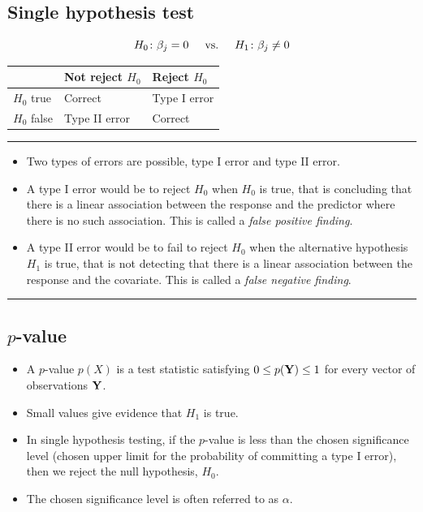 \documentclass[
  letterpaper,
  DIV=11,
  numbers=noendperiod]{scrartcl}
\providecommand{\tightlist}{%
  \setlength{\itemsep}{0pt}\setlength{\parskip}{0pt}}\usepackage{longtable,booktabs,array}
\begin{document}
\hypertarget{single-hypothesis-test}{%
\subsection{Single hypothesis test}\label{single-hypothesis-test}}

\[H_{0}\colon \beta_j=0 \hspace{0.5cm} \text{vs.} \hspace{0.5cm} H_{1}\colon \beta_j \neq 0\]

\begin{longtable}[]{@{}lll@{}}
\toprule()
& Not reject \(H_0\) & Reject \(H_0\) \\
\midrule()
\endhead
\(H_0\) true & Correct & Type I error \\
\(H_0\) false & Type II error & Correct \\
\bottomrule()
\end{longtable}

\begin{center}\rule{0.5\linewidth}{0.5pt}\end{center}

\begin{itemize}
\tightlist
\item
  Two types of errors are possible, type I error and type II error.
\item
  A type I error would be to reject \(H_0\) when \(H_0\) is true, that
  is concluding that there is a linear association between the response
  and the predictor where there is no such association. This is called a
  \emph{false positive finding}.
\item
  A type II error would be to fail to reject \(H_0\) when the
  alternative hypothesis \(H_1\) is true, that is not detecting that
  there is a linear association between the response and the covariate.
  This is called a \emph{false negative finding}.
\end{itemize}

\begin{center}\rule{0.5\linewidth}{0.5pt}\end{center}

\hypertarget{p-value}{%
\subsection{\texorpdfstring{\(p\)-value}{p-value}}\label{p-value}}

\begin{itemize}
\tightlist
\item
  A \(p\)-value \(p(X)\) is a test statistic satisfying
  \(0 \leq p({\bf Y}) \leq 1\) for every vector of observations
  \(\bf{Y}\).
\item
  Small values give evidence that \(H_1\) is true.
\item
  In single hypothesis testing, if the \(p\)-value is less than the
  chosen significance level (chosen upper limit for the probability of
  committing a type I error), then we reject the null hypothesis,
  \(H_0\).
\item
  The chosen significance level is often referred to as \(\alpha\).
\end{itemize}
\end{document}
